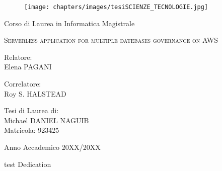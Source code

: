 \documentclass[11pt,a4paper,twoside,
openright]{book}
\newenvironment{dedication}
  {
   \thispagestyle{empty}%
   \vspace*{\stretch{1}}%
   \itshape             %
   \raggedleft          %
  }
  {\par %
   \vspace{\stretch{3}} %
   \clearpage           %
  }
\begin{document}
\begin{titlepage}
	
	\begin{figure}
		\centering
		\texttt{[image: chapters/images/tesiSCIENZE\_TECNOLOGIE.jpg]}
		\vspace{0.5 cm}
	\end{figure}
	

\begin{center}
{\LARGE Corso di Laurea in Informatica Magistrale}
\end{center}

\begin{center}
\vspace{3 cm}
{\Large \textsc{Serverless application for multiple datebases governance on AWS} }
\end{center}
\par
  \vspace{3 cm}
  
  \begin{flushleft}
  		 Relatore:\\ Elena PAGANI
		 
  		 \noindent Correlatore:\\ Roy S. HALSTEAD
  \end{flushleft}
  \vspace{1 cm}
  \begin{flushright}
  	Tesi di Laurea di:\\ Michael DANIEL NAGUIB\\ Matricola: 923425
  \end{flushright}
    	  
\vfill
\begin{center}
	{\large Anno Accademico 20XX/20XX}
\end{center}
\end{titlepage}


\begin{dedication}
test Dedication
\end{dedication}

\tableofcontents 







\end{document}
